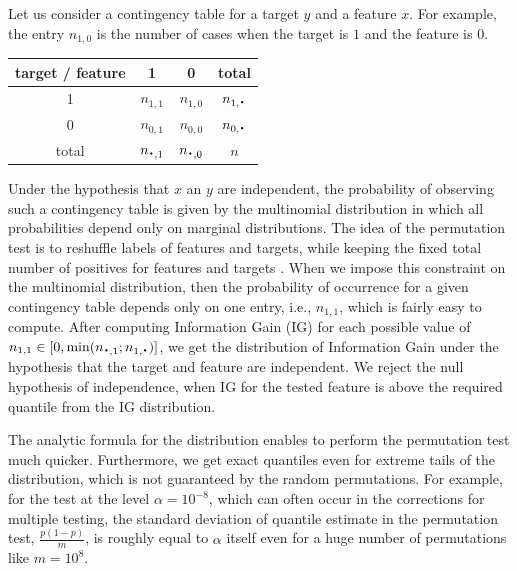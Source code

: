 \documentclass[fleqn,10pt,twoside]{gcb15submission}
\newcommand*{\bigcdot}{\raisebox{-0.25ex}{\scalebox{1.5}{$\cdot$}}}
\begin{document}
Let us consider a contingency table for a target $y$ and 
a feature $x$. For example, the entry $n_{1,0}$ is the number of cases when the 
target is $1$ and the feature is $0$.

\begin{center}
\begin{tabular}{ | c || c | c | c | }
%
%
  \hline			
  target / feature & 1 & 0 & total\\ \hline
 1 & $n_{1,1}$ & $n_{1,0}$ & $n_{1,\bigcdot}$ \\
 0 & $n_{0,1}$ & $n_{0,0}$ & $n_{0,\bigcdot}$ \\ \hline
 total & $n_{\bigcdot,1}$ & $n_{\bigcdot,0}$ & $n$ \\
  \hline  
\end{tabular} 
\end{center}

  Under the hypothesis that $x$ an $y$ are independent, the probability of 
observing such a contingency table is given by the multinomial distribution 
in which all probabilities depend only on marginal distributions. The 
idea of the permutation test is to reshuffle labels of features and targets,  while 
keeping the fixed total number of positives for features and targets . When we 
impose this constraint on the multinomial distribution, then the probability of 
occurrence for a given contingency table depends only on one entry, i.e., 
$n_{1,1}$, which is fairly easy to compute. After computing Information Gain 
(IG) for each possible value of $n_{1,1} \in [0,\min(n_{\bigcdot, 1}; n_{1, 
\bigcdot})]$, we get the distribution of Information Gain under the hypothesis that 
the target and feature are independent. We reject the null hypothesis of independence, when IG for 
%
%
%
%
%
the tested feature is above the required quantile from the IG distribution.

  The analytic formula for the distribution enables to perform the permutation 
test much quicker. Furthermore, we get exact quantiles even for extreme tails of 
the distribution, which is not guaranteed by the random permutations. For 
example, for the test at the level $\alpha=10^{-8}$, which can often occur in the 
corrections for multiple testing, the standard deviation of quantile estimate in 
the permutation test, $\frac{p(1-p)}{m}$, is roughly equal to $\alpha$ itself even 
for a huge number of permutations like $m=10^8$.
\end{document}
